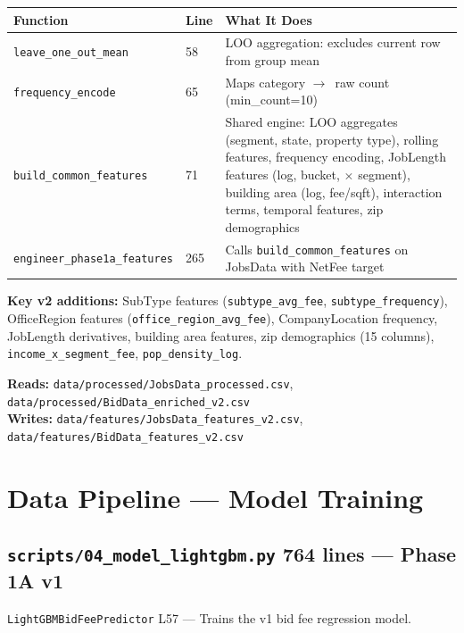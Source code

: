 \documentclass[11pt,a4paper]{article}
\newcommand{\file}[1]{\texttt{\color{gssblue!70!black}#1}}
\newcommand{\func}[1]{\texttt{\color{gssgreen!80!black}#1}}
\newcommand{\cls}[1]{\texttt{\color{uipurple}#1}}
\newcommand{\lineref}[1]{\textcolor{gssgray}{\small L#1}}
\newcommand{\arrow}{$\rightarrow$}
\newcommand{\pipetag}[1]{\colorbox{pipeblue!15}{\small\textcolor{pipeblue}{\textbf{#1}}}}
\begin{document}
\begin{longtable}{l l p{8cm}}
\toprule
\textbf{Function} & \textbf{Line} & \textbf{What It Does} \\
\midrule
\endhead
\func{leave\_one\_out\_mean} & 58 & LOO aggregation: excludes current row from group mean \\
\func{frequency\_encode} & 65 & Maps category \arrow\ raw count (min\_count=10) \\
\func{build\_common\_features} & 71 & Shared engine: LOO aggregates (segment, state, property type), rolling features, frequency encoding, JobLength features (log, bucket, $\times$ segment), building area (log, fee/sqft), interaction terms, temporal features, zip demographics \\
\func{engineer\_phase1a\_features} & 265 & Calls \func{build\_common\_features} on JobsData with NetFee target \\
\bottomrule
\end{longtable}

\textbf{Key v2 additions:} SubType features (\func{subtype\_avg\_fee}, \func{subtype\_frequency}),
OfficeRegion features (\func{office\_region\_avg\_fee}), CompanyLocation frequency,
JobLength derivatives, building area features, zip demographics (15 columns),
\func{income\_x\_segment\_fee}, \func{pop\_density\_log}.

\textbf{Reads:} \file{data/processed/JobsData\_processed.csv}, \file{data/processed/BidData\_enriched\_v2.csv}\\
\textbf{Writes:} \file{data/features/JobsData\_features\_v2.csv}, \file{data/features/BidData\_features\_v2.csv}

\section{Data Pipeline --- Model Training}
\label{sec:training}

\subsection{\file{scripts/04\_model\_lightgbm.py} \pipetag{764 lines} --- Phase 1A v1}

\cls{LightGBMBidFeePredictor} \lineref{57} --- Trains the v1 bid fee regression model.
\end{document}
